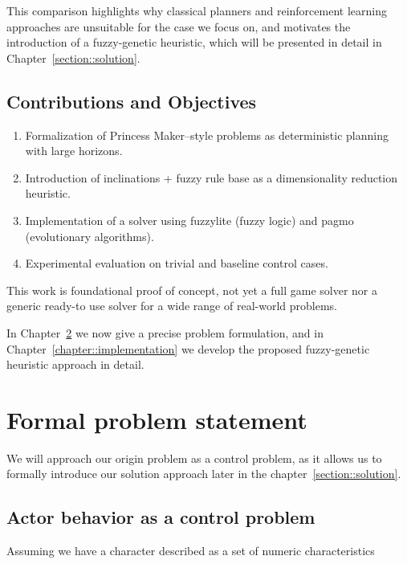 \documentclass[12pt, a4paper]{report}
\begin{document}
This comparison highlights why classical planners and reinforcement learning approaches are unsuitable for the case we focus on, and motivates the introduction of a fuzzy-genetic heuristic, which will be presented in detail in Chapter~\ref{section::solution}.

	
	\section{Contributions and Objectives}
	
		\begin{enumerate}
			\item Formalization of Princess Maker–style problems as deterministic planning with large horizons.
		
			\item Introduction of inclinations + fuzzy rule base as a dimensionality reduction heuristic.
			
			\item Implementation of a solver using fuzzylite (fuzzy logic) and pagmo (evolutionary algorithms).
			
			\item Experimental evaluation on trivial and baseline control cases.
		\end{enumerate}	
		
		This work is foundational proof of concept, not yet a full game solver nor a generic ready-to use solver for a wide range of real-world problems.
		
		In Chapter~\ref{problem-statement} we now give a precise problem formulation, and in Chapter~\ref{chapter::implementation} we develop the proposed fuzzy-genetic heuristic approach in detail.

	
	\chapter{Formal problem statement}\label{problem-statement}

	We will approach our origin problem as a control problem, as it allows us to formally introduce our solution approach later in the chapter~\ref{section::solution}.

	\section{Actor behavior as a control problem}

	Assuming we have a character described as a set of numeric characteristics
	
\end{document}

